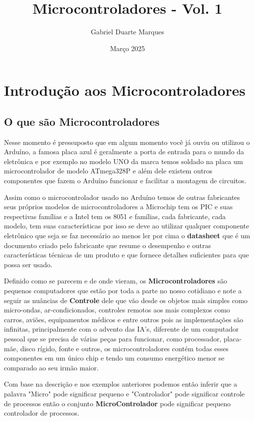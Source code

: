 \documentclass[12pt,a4paper]{book}
\title{Microcontroladores - Vol. 1}
\author{Gabriel Duarte Marques}
\date{Março 2025}
\begin{document}
\maketitle
\tableofcontents

\chapter{Introdução aos Microcontroladores}
\section{O que são Microcontroladores}
Nesse momento é pressuposto que em algum momento você já ouviu ou utilizou o Arduíno, a famosa placa azul é geralmente a porta de entrada para o mundo da eletrônica e por exemplo no modelo UNO da marca temos soldado na placa um microcontrolador de modelo ATmega328P e além dele existem outros componentes que fazem o Arduíno funcionar e facilitar a montagem de circuitos.\par
Assim como o microcontrolador usado no Arduíno temos de outras fabricantes seus próprios modelos de microcontroladores a Microchip tem os PIC e suas respectivas famílias e a Intel tem os 8051 e famílias, cada fabricante, cada modelo, tem suas características por isso se deve ao utilizar qualquer componente eletrônico que seja se faz necessário ao menos ler por cima o \textbf{datasheet} que é um documento criado pelo fabricante que resume o desempenho e outras características técnicas de um produto e que fornece detalhes suficientes para que possa ser usado.\par
Definido como se parecem e de onde vieram, os \textbf{Microcontroladores} são pequenos computadores que estão por toda a parte no nosso cotidiano e note a seguir as nuâncias de \textbf{Controle} dele que vão desde os objetos mais simples como micro-ondas, ar-condicionados, controles remotos aos mais complexos como carros, aviões, equipamentos médicos e entre outros pois as implementações são infinitas, principalmente com o advento das IA's, diferente de um computador pessoal que se precisa de várias peças para funcionar, como processador, placa-mãe, disco rígido, fonte e outros, os microcontroladores contém todas esses componentes em um único chip e tendo um consumo energético menor se comparado ao seu irmão maior. \par
Com base na descrição e nos exemplos anteriores podemos então inferir que a palavra "Micro" pode significar pequeno e "Controlador" pode significar controle de processos então o conjunto \textbf{MicroControlador} pode significar pequeno controlador de processos.
\newpage
\end{document}
